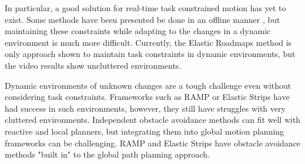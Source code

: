 \documentclass[10pt,conference]{ieeeconf}
\begin{document}
    In particular, a good solution for real-time task constrained motion has yet to exist. Some methods have been presented be done in an offline manner \cite{stilman2007task}\cite{berenson2011task}, but maintaining these constraints while adapting to the changes in a dynamic environment is much more difficult. Currently, the Elastic Roadmaps method is only approach shown to maintain task constraints in dynamic environments, but the video results show uncluttered environments. 
    
    Dynamic environments of unknown changes are a tough challenge even without considering task constraints. Frameworks such as RAMP or Elastic Strips have had success in such environments, however, they still have struggles with very cluttered environments. Independent obstacle avoidance methods can fit well with reactive and local planners, but integrating them into global motion planning frameworks can be challenging. RAMP and Elastic Strips have obstacle avoidance methods "built in" to the global path planning approach. 
    
    
    
    
    
    
    
    
    






\end{document}

